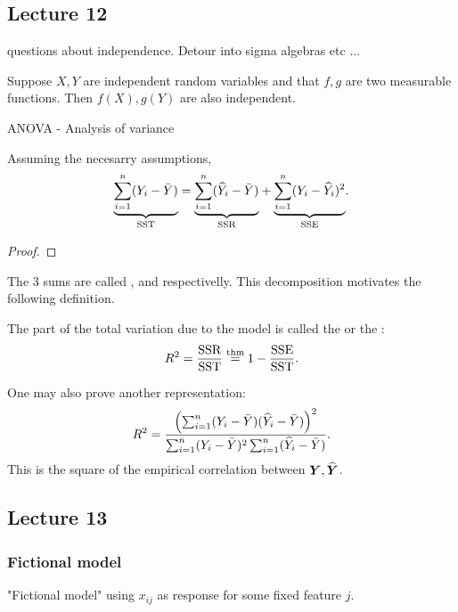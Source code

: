 \subsection*{Lecture 12}

questions about independence. Detour into sigma algebras etc ...

\begin{theorem}
    Suppose $X, Y$ are independent random variables and that $f, g$ are two measurable functions. Then $f(X), g(Y)$ are also independent. 
\end{theorem}

ANOVA - Analysis of variance

\begin{theorem} \label{thm:ANOVA}
    Assuming the necesarry assumptions, 
    $$
    \underset{\mathrm{SST}}{\underbrace{
        \sum_{i=1}^n (Y_i - \bar{Y})}} = 
    \underset{\mathrm{SSR}}{\underbrace{
        \sum_{i=1}^n (\widehat{Y}_i - \bar{Y})}} + 
    \underset{\mathrm{SSE}}{\underbrace{
        \sum_{i=1}^n (Y_i - \widehat{Y}_i)^2}}. 
    $$
\end{theorem}
\begin{proof}
\end{proof}
The 3 sums are called ,  and  respectivelly. 
This decomposition motivates the following definition. 
\begin{definition}
    The part of the total variation due to the model is called the  or the :
    $$
        R^2 = \frac{\mathrm{SSR}}{\mathrm{SST}} \overset{\mathrm{thm}} = 1 - \frac{\mathrm{SSE}}{\mathrm{SST}}.
    $$
\end{definition}
One may also prove another representation:
$$
    R^2 = \frac{\left( \sum_{i=1}^n(Y_i-\bar{Y})(\widehat{Y}_i-\bar{Y}) \right)^2}{\sum_{i=1}^n(Y_i-\bar{Y})^2\sum_{i=1}^n(\widehat{Y}_i-\bar{Y})}.
$$
This is the square of the empirical correlation between $\boldsymbol{Y}, \widehat{\boldsymbol{Y}}$.

\subsection*{Lecture 13}


\subsubsection*{Fictional model}
"Fictional model" using $x_{ij}$ as response for some fixed feature $j$. 

